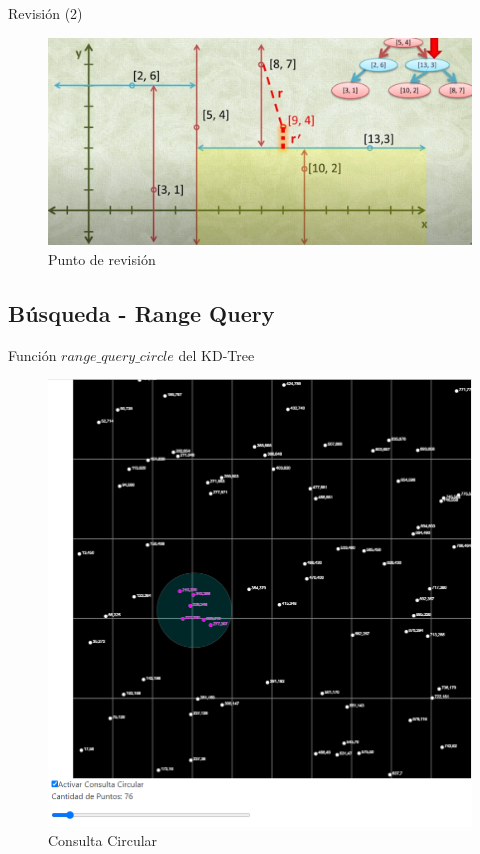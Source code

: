 \documentclass[11pt]{beamer}
\begin{document}
		\begin{frame}{Revisión (2)}
			\justifying
			\begin{figure}[H]
				\centering
				\includegraphics[scale=0.25]{img/knn7.PNG}
				\caption{Punto de revisión}
				\label{fig:knn2}
			\end{figure}
		\end{frame}
		
	
		
		\subsection{Búsqueda - Range Query}
		\begin{frame}{Función $range\_query\_circle$ del KD-Tree}
			\justifying
			\begin{figure}[H]
				\centering
				\includegraphics[scale=0.25]{img/circular1.png}
				\caption{Consulta Circular}
				\label{fig:rangeQueryCircle}
			\end{figure}
		\end{frame}
		
\end{document}
